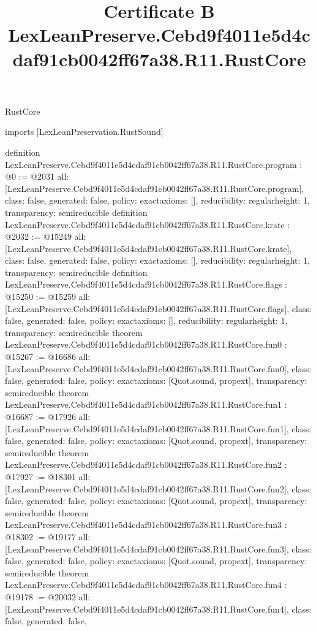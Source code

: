 \begin{lexlean}{RustCore}
\title{Certificate B LexLeanPreserve.Cebd9f4011e5d4cdaf91cb0042ff67a38.R11.RustCore}
\begin{coremodule}
imports [LexLeanPreservation.RustSound]

definition LexLeanPreserve.Cebd9f4011e5d4cdaf91cb0042ff67a38.R11.RustCore.program : @0 := @2031 {
  all: [LexLeanPreserve.Cebd9f4011e5d4cdaf91cb0042ff67a38.R11.RustCore.program],
  class: false,
  generated: false,
  policy: exact{axioms: []},
  reducibility: regular{height: 1},
  transparency: semireducible
}
definition LexLeanPreserve.Cebd9f4011e5d4cdaf91cb0042ff67a38.R11.RustCore.krate : @2032 := @15249 {
  all: [LexLeanPreserve.Cebd9f4011e5d4cdaf91cb0042ff67a38.R11.RustCore.krate],
  class: false,
  generated: false,
  policy: exact{axioms: []},
  reducibility: regular{height: 1},
  transparency: semireducible
}
definition LexLeanPreserve.Cebd9f4011e5d4cdaf91cb0042ff67a38.R11.RustCore.flags : @15250 := @15259 {
  all: [LexLeanPreserve.Cebd9f4011e5d4cdaf91cb0042ff67a38.R11.RustCore.flags],
  class: false,
  generated: false,
  policy: exact{axioms: []},
  reducibility: regular{height: 1},
  transparency: semireducible
}
theorem LexLeanPreserve.Cebd9f4011e5d4cdaf91cb0042ff67a38.R11.RustCore.fun0 : @15267 := @16686 {
  all: [LexLeanPreserve.Cebd9f4011e5d4cdaf91cb0042ff67a38.R11.RustCore.fun0],
  class: false,
  generated: false,
  policy: exact{axioms: [Quot.sound, propext]},
  transparency: semireducible
}
theorem LexLeanPreserve.Cebd9f4011e5d4cdaf91cb0042ff67a38.R11.RustCore.fun1 : @16687 := @17926 {
  all: [LexLeanPreserve.Cebd9f4011e5d4cdaf91cb0042ff67a38.R11.RustCore.fun1],
  class: false,
  generated: false,
  policy: exact{axioms: [Quot.sound, propext]},
  transparency: semireducible
}
theorem LexLeanPreserve.Cebd9f4011e5d4cdaf91cb0042ff67a38.R11.RustCore.fun2 : @17927 := @18301 {
  all: [LexLeanPreserve.Cebd9f4011e5d4cdaf91cb0042ff67a38.R11.RustCore.fun2],
  class: false,
  generated: false,
  policy: exact{axioms: [Quot.sound, propext]},
  transparency: semireducible
}
theorem LexLeanPreserve.Cebd9f4011e5d4cdaf91cb0042ff67a38.R11.RustCore.fun3 : @18302 := @19177 {
  all: [LexLeanPreserve.Cebd9f4011e5d4cdaf91cb0042ff67a38.R11.RustCore.fun3],
  class: false,
  generated: false,
  policy: exact{axioms: [Quot.sound, propext]},
  transparency: semireducible
}
theorem LexLeanPreserve.Cebd9f4011e5d4cdaf91cb0042ff67a38.R11.RustCore.fun4 : @19178 := @20032 {
  all: [LexLeanPreserve.Cebd9f4011e5d4cdaf91cb0042ff67a38.R11.RustCore.fun4],
  class: false,
  generated: false,
}
\end{coremodule}
\end{lexlean}
